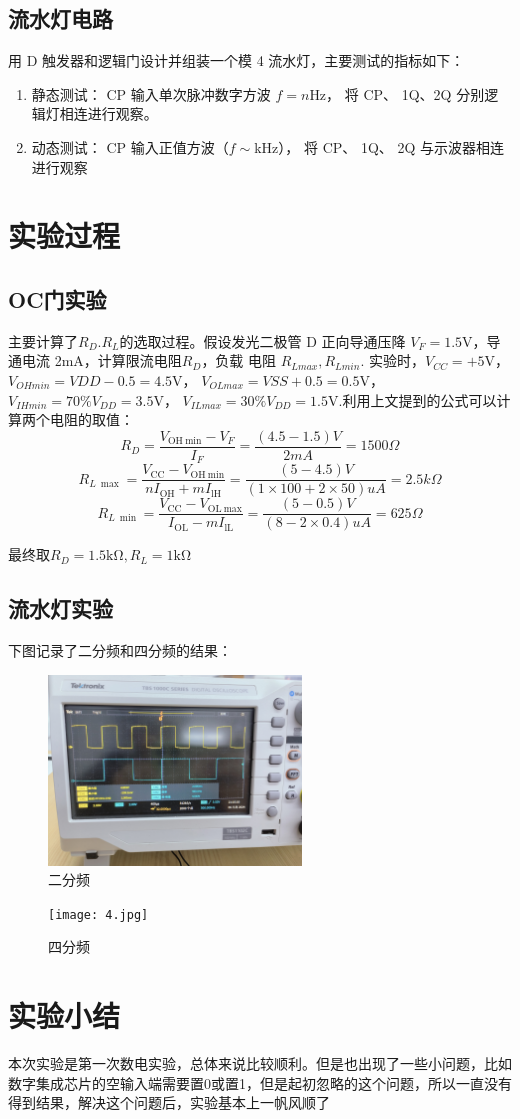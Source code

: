 \documentclass[a4paper,11pt,UTF8]{article}
\begin{document}
\subsection{流水灯电路}
用 D 触发器和逻辑门设计并组装一个模 4 流水灯，主要测试的指标如下：
\begin{enumerate}
    \item 静态测试： CP 输入单次脉冲数字方波 $f=n$Hz， 将 CP、 1Q、2Q 分别逻辑灯相连进行观察。
    \item 动态测试： CP 输入正值方波（$f\sim$kHz）， 将 CP、 1Q、 2Q 与示波器相连进行观察
\end{enumerate}
\section{实验过程}
\subsection{OC门实验}
主要计算了$R_D. R_L$的选取过程。假设发光二极管 D 正向导通压降 $V_F=1.5$V，导通电流 2mA，计算限流电阻$R_D$，负载
电阻 $R_{Lmax},R_{Lmin}$. 实验时，$V_{CC}=+5$V， $V_{OHmin}=V{DD}-0.5=4.5$V， $V_{OLmax}=V{SS}+0.5=0.5$V， $V_{IHmin}=70\%V_{DD}=3.5$V，
$V_{ILmax}=30\%V_{DD}=1.5$V.利用上文提到的公式可以计算两个电阻的取值：
$$R_D=\frac{V_{\mathrm{OH~min}}-V_F}{I_F}=\frac{(4.5-1.5)V}{2mA}=1500\Omega$$
$$
R_{L~\max}=\frac{V_{\mathrm{CC}}-V_{\mathrm{OH~min}}}{nI_{\mathrm{OH}}+mI_{\mathrm{lH}}}=\frac{(5-4.5)V}{(1\times100+2\times50)uA}=2.5k\Omega$$
$$
R_{L~\min}=\frac{V_{\mathrm{CC}}-V_{\mathrm{OL~max}}}{I_{\mathrm{OL}}-mI_{\mathrm{lL}}}=\frac{(5-0.5)V}{(8-2\times0.4)uA}=625\Omega$$

最终取$R_D=1.5\mathrm{k\Omega},R_L=1\mathrm{k\Omega}$
\subsection{流水灯实验}
下图记录了二分频和四分频的结果：
\begin{figure}[!ht]
    \centering
    \includegraphics[width=0.6\textwidth]{2.jpg}
    \caption{二分频}
    \label{fig:enter-label}
\end{figure}
\begin{figure}[!ht]
    \centering
    \texttt{[image: 4.jpg]}
    \caption{四分频}
    \label{fig:enter-label}
\end{figure}
\section{实验小结}
本次实验是第一次数电实验，总体来说比较顺利。但是也出现了一些小问题，比如数字集成芯片的空输入端需要置0或置1，但是起初忽略的这个问题，所以一直没有得到结果，解决这个问题后，实验基本上一帆风顺了
\end{document}
